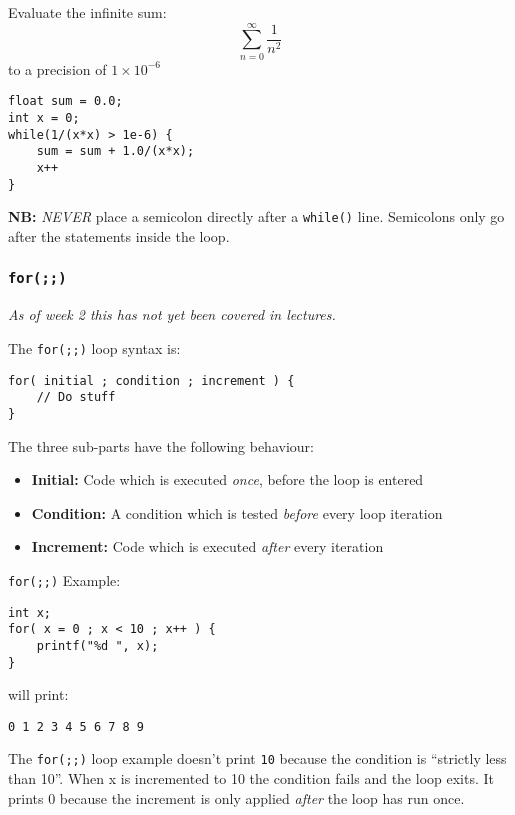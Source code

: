 \documentclass{lab}
\begin{document}
\begin{multicols}{2}
Evaluate the infinite sum:
\begin{equation}
\sum_{n=0}^{\infty} \frac{1}{n^2}
\end{equation}
to a precision of $1 \times 10^{-6}$
\begin{lstlisting}[style=CStyle]
float sum = 0.0;
int x = 0;
while(1/(x*x) > 1e-6) {
	sum = sum + 1.0/(x*x);
	x++
}
\end{lstlisting}

\textbf{NB:} \textit{NEVER} place a semicolon directly after a \texttt{while()} line. Semicolons only go after the statements inside the loop.

\subsubsection{\texttt{for(;;)}}\label{sec:for}

\textit{As of week 2 this has not yet been covered in lectures.}

The \texttt{for(;;)} loop syntax is:

\begin{lstlisting}[style=CStyle]
for( initial ; condition ; increment ) {
	// Do stuff
}
\end{lstlisting}

The three sub-parts have the following behaviour:

\begin{itemize}
\item \textbf{Initial:} Code which is executed \textit{once}, before the loop is entered
\item \textbf{Condition:} A condition which is tested \textit{before} every loop iteration
\item \textbf{Increment:} Code which is executed \textit{after} every iteration
\end{itemize}

\texttt{for(;;)} Example:

\begin{lstlisting}[style=CStyle]
int x;
for( x = 0 ; x < 10 ; x++ ) {
	printf("%d ", x);
}
\end{lstlisting}

will print:

\texttt{0 1 2 3 4 5 6 7 8 9}

The \texttt{for(;;)} loop example doesn't print \texttt{10} because the condition is ``strictly less than 10''. When x is incremented to 10 the condition fails and the loop exits. It prints 0 because the increment is only applied \textit{after} the loop has run once.


\end{multicols}
\end{document}
